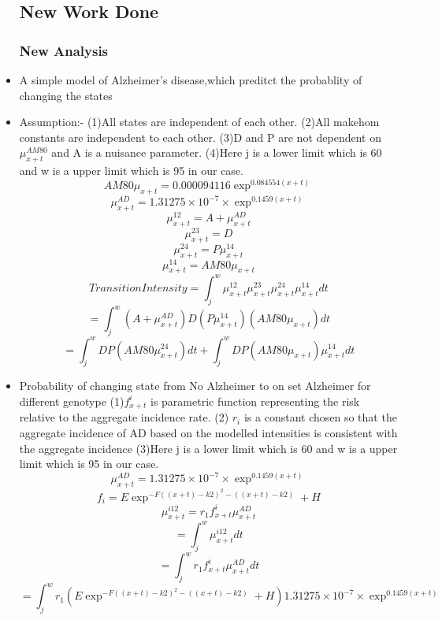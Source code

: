 \documentclass{article}
\begin{document}
\begin{itemize}
\subsection{New Work Done}

\subsubsection{New Analysis}
\item A simple model of Alzheimer's disease,which preditct the probablity of changing the states
\item Assumption:-
\newline
(1)All states are independent of each other.
\newline
(2)All makehom constants are independent to each other.
\newline
(3)D and P are not dependent on $\mu_{x+t}^{AM80}$ and A is a nuisance parameter.
\newline
(4)Here j is a lower limit which is 60 and w is a upper limit which is 95 in our case. 
\newline
\[{AM80}\mu_{x+t} = 0.000094116\exp^{0.084554(x+t)}\]
\[\mu_{x+t}^{AD}=1.31275\times 10^{-7}\times\exp^{0.1459(x+t)} \]
\[\mu_{x+t}^{12} = A +\mu_{x+t}^{AD} \]
\[\mu_{x+t}^{23} = D\]
\[\mu_{x+t}^{24} = P\mu_{x+t}^{14}\]
\[\mu_{x+t}^{14} = AM80\mu_{x+t}  \]
\[Transition Intensity =\int_{j}^{w} \mu_{x+t}^{12} \mu_{x+t}^{23} \mu_{x+t}^{24} \mu_{x+t}^{14}dt \]
\[= \int_{j}^{w} (A +\mu_{x+t}^{AD})D(P\mu_{x+t}^{14})(AM80\mu_{x+t})dt \]
\[= \int_{j}^{w}DP(AM80\mu_{x+t}^{24})dt + \int_{j}^{w}DP(AM80\mu_{x+t}) \mu_{x+t}^{14}dt\]
\newline
\newline
\item Probability of changing state from No Alzheimer to on set Alzheimer for different genotype
\newline
(1)$f_{x+t}^{i}$ is parametric function representing the risk relative to the
aggregate incidence rate.
\newline
(2) $r_i$ is a constant chosen so that the aggregate incidence of AD based on the modelled intensities is consistent with the aggregate incidence
\newline
(3)Here j is a lower limit which is 60 and w is a upper limit which is 95 in our case.
\newline
\[\mu_{x+t}^{AD}=1.31275\times 10^{-7}\times\exp^{0.1459(x+t)} \]
\[f_i = E \exp^{-F((x+t)-k2)^2 -((x+t)-k2)}+H \]
\[\mu_{x+t}^{i12} = r_1 f_{x+t}^{i}\mu_{x+t}^{AD} \]
\[= \int_{j}^{w}\mu_{x+t}^{i12}dt\] 
\[= \int_{j}^{w} r_1 f_{x+t}^{i}\mu_{x+t}^{AD} dt  \]
\[= \int_{j}^{w}r_1(E \exp^{-F((x+t)-k2)^2 -((x+t)-k2)}+H)1.31275\times 10^{-7}\times\exp^{0.1459(x+t)} \]
\newpage

\end{itemize}
\end{document}
